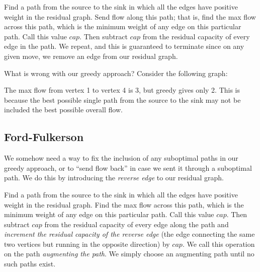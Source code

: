 Find a path from the source to the sink in which all the edges have positive weight in the residual graph. Send flow along this path; that is, find the max flow across this path, which is the minimum weight of any edge on this particular path. Call this value $cap$. Then subtract $cap$ from the residual capacity of every edge in the path. We repeat, and this is guaranteed to terminate since on any given move, we remove an edge from our residual graph.

What is wrong with our greedy approach? Consider the following graph:

\begin{center}
\end{center}

The max flow from vertex 1 to vertex 4 is 3, but greedy gives only 2. This is because the best possible single path from the source to the sink may not be included the best possible overall flow.

\subsection{Ford-Fulkerson}

We somehow need a way to fix the inclusion of any suboptimal paths in our greedy approach, or to ``send flow back'' in case we sent it through a suboptimal path. We do this by introducing the \textit{reverse edge} to our residual graph.

Find a path from the source to the sink in which all the edges have positive weight in the residual graph. Find the max flow across this path, which is the minimum weight of any edge on this particular path. Call this value $cap$. Then subtract $cap$ from the residual capacity of every edge along the path and \textit{increment the residual capacity of the reverse edge} (the edge connecting the same two vertices but running in the opposite direction) by $cap$. We call this operation on the path \textit{augmenting the path}. We simply choose an augmenting path until no such paths exist.

